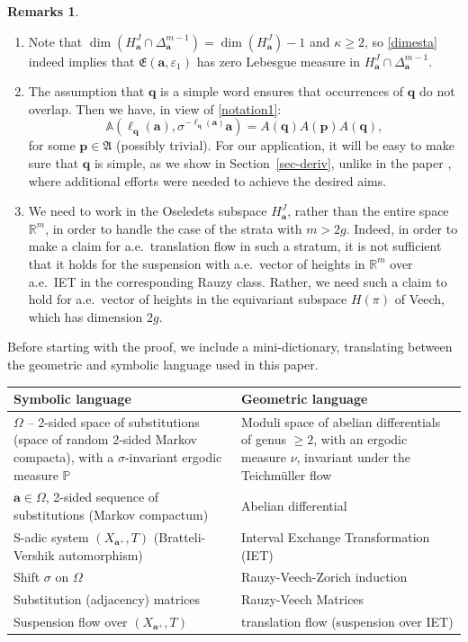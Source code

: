 \documentclass[11pt]{article}
\newcommand{\smaller}{\small}
\newcommand{\skpt}{\smallskip}
\numberwithin{equation}{section}\newcommand{\Relation}[2][]{}\newtheorem*{prop*}{Proposition}
\let\epsilon\varepsilon
\theoremstyle{plain}
\theoremstyle{definition}
\newtheorem*{rems*}{Remarks}
\newcommand\bom{{\boldsymbol a}}\let\ba\bom
\newcommand\bp{{\boldsymbol p}}
\newcommand\bq{{\boldsymbol q}}
\let\Om\Omega
\let\sig\sigma
\newcommand\FrA{\mathfrak{A}}
\newcommand\Fre{\mathfrak{E}}
\newcommand\Aa{\mathbb{A}}
\newcommand{\R}{\mathbb{R}}
\renewcommand{\P}{\mathbb{P}}
\newcommand\be{\begin{equation}}
\newcommand\ee{\end{equation}}
\begin{document}
\pagebreak[2]
\skpt
\begin{rems*}
\begin{enumerate}
\item
Note that $\dim( H^J_\bom \cap \Delta_\bom^{m-1}) = \dim(H^J_\bom)-1$ and $\kappa\ge 2$, so \eqref{dimesta} indeed implies that $\Fre(\bom,\epsilon_1)$ has zero Lebesgue measure in $H^J_\bom \cap \Delta_\bom^{m-1}$.

\item
The assumption that $\bq$ is a simple word ensures that occurrences of $\bq$ do not overlap. Then we have, in view of \eqref{notation1}:
\be \label{egstar}
\Aa(\ell_\bq(\bom), \sig^{-\ell_\bq(\bom)}\bom) = A(\bq) A(\bp) A(\bq),
\ee
for some $\bp \in \FrA$ (possibly trivial). For our application, it will be easy to make sure that $\bq$ is simple, as we show in Section~\ref{sec-deriv}, unlike in the paper \cite{BufGur}, where additional efforts were needed to achieve the desired aims.

\item
We need to work in the Oseledets subspace $H^J_\ba$, rather than the entire space~$\R^m$, in order to handle the case of the strata with
$m>2g$. Indeed, in order to make a claim for a.e.\ translation flow in such a stratum, it is not sufficient that it holds for the suspension with a.e.\ vector of heights in $\R^m$ over a.e.\ IET in the corresponding Rauzy class. Rather, we need such a claim to hold for a.e.\ vector of heights in the equivariant subspace $H(\pi)$ of Veech, which has dimension $2g$.
\end{enumerate}
\end{rems*}

Before starting with the proof, we include a mini-dictionary, translating between the geometric and symbolic language used in this paper.
\begin{table}[h]
\begin{center}
\smaller
\renewcommand{\arraystretch}{1.3}
\begin{tabular}{|p{}|p{}|}
\hline
\hfill Symbolic language\hfill\mbox{}&\hfill Geometric language\hfill\mbox{}\\
\hline
$\Om$ -- 2-sided space of substitutions (space of random 2-sided Markov compacta), with a $\sig$-invariant ergodic measure $\P$ & Moduli space of abelian differentials of genus $\ge 2$, with an ergodic measure $\nu$, invariant under the Teichmüller flow \\
\hline
$\ba\in \Om$, 2-sided sequence of substitutions (Markov compactum) & Abelian differential \\
\hline
S-adic system $(X_{\ba^+},T)$ (Bratteli-Vershik automorphism) &Interval Exchange Transformation (IET)\\
\hline
Shift $\sig$ on $\Om$ & Rauzy-Veech-Zorich induction \\
\hline
Substitution (adjacency) matrices & Rauzy-Veech Matrices \\
\hline
Suspension flow over $(X_{\ba^+},T)$ & translation flow (suspension over IET) \\
\hline
\end{tabular}
\end{center}
\end{table}
\end{document}
